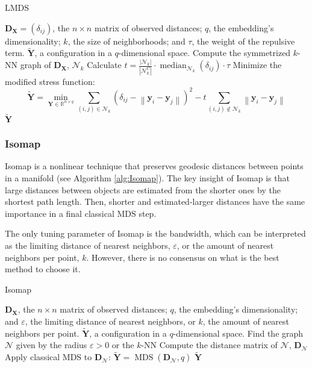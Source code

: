 \begin{algorithm}[ht]
    \caption{LMDS}
    \label{alg:LMDS}
    
    \begin{algorithmic}[1]
    \REQUIRE $\mathbf{D_X} = (\delta_{ij})$, the $n \times n$ matrix of observed distances; $q$, the embedding's dimensionality; $k$, the size of neighborhoods; and $\tau$, the weight of the repulsive term.
    \ENSURE $\mathbf{\tilde{Y}}$, a configuration in a $q$-dimensional space.
    \STATE Compute the symmetrized $k$-NN graph of $\mathbf{D_X}$, $\mathcal{N}_k$
    \STATE Calculate $t=\frac{|\mathcal{N}_k|}{\left|\mathcal{N}_k^C\right|} \cdot \operatorname{median}_{\mathcal{N}_k}\left(\delta_{ij}\right) \cdot \tau$
    \STATE Minimize the modified stress function:
    $$
    \mathbf{\tilde{Y}} = \min_{\mathbf{Y} \in \mathbb{R}^{n\times q}} \sum_{(i, j) \in \mathcal{N}_k}\left(\delta_{ij}-\left\|\mathbf{y}_i-\mathbf{y}_j\right\|\right)^2 - t \sum_{(i, j) \notin \mathcal{N}_k}\left\|\mathbf{y}_i-\mathbf{y}_j\right\|
    $$
    \RETURN $\mathbf{\tilde{Y}}$
    \end{algorithmic}
\end{algorithm}

\subsubsection{Isomap}

Isomap \citep{Tenenbaum2000} is a nonlinear technique that preserves geodesic distances between points in a manifold (see Algorithm \ref{alg:Isomap}). The key insight of Isomap is that large distances between objects are estimated from the shorter ones by the shortest path length. Then, shorter and estimated-larger distances have the same importance in a final classical MDS step.

The only tuning parameter of Isomap is the bandwidth, which can be interpreted as the limiting distance of nearest neighbors, $\varepsilon$,  or the amount of nearest neighbors per point, $k$. However, there is no consensus on what is the best method to choose it.

\begin{algorithm}[ht]
    \caption{Isomap}
    \label{alg:Isomap}

    \begin{algorithmic}[1]
    \REQUIRE $\mathbf{D_X}$, the $n \times n$ matrix of observed distances; $q$, the embedding's dimensionality; and $\varepsilon$, the limiting distance of nearest neighbors, or $k$, the amount of nearest neighbors per point.
    \ENSURE $\mathbf{\tilde{Y}}$, a configuration in a $q$-dimensional space.
    \STATE Find the graph $\mathcal{N}$ given by the radius $\varepsilon>0$ or the $k$-NN
    \STATE Compute the distance matrix of $\mathcal{N}$, $\mathbf{D}_{\mathcal{N}}$
    \STATE Apply classical MDS to $\mathbf{D}_{\mathcal{N}}$: $\mathbf{\tilde{Y}} = \operatorname{MDS}(\mathbf{D}_{\mathcal{N}}, q)$
    \RETURN $\mathbf{\tilde{Y}}$
    
    \end{algorithmic}
\end{algorithm}

